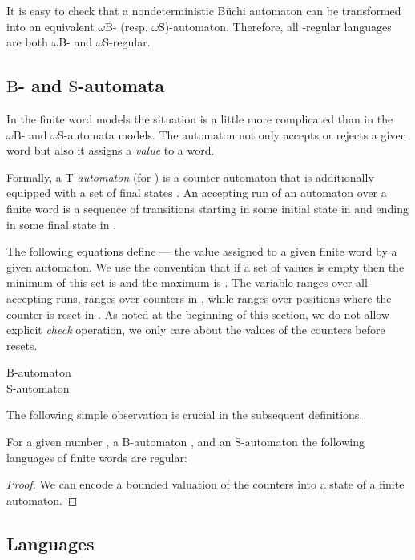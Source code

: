 \documentclass{LMCS}
\newcommand{\wB}{\ensuremath{\omega \mathrm{B}}\xspace}
\newcommand{\wS}{\ensuremath{\omega \mathrm{S}}\xspace}
\newcommand{\fT}{\ensuremath{\mathrm{T}}\xspace}
\newcommand{\fB}{\ensuremath{\mathrm{B}}\xspace}
\newcommand{\fS}{\ensuremath{\mathrm{S}}\xspace}
\begin{document}
It is easy to check that a nondeterministic B\"uchi automaton can be transformed into an equivalent \wB- (resp. \wS)-automaton. Therefore, all -regular languages are both \wB- and \wS-regular.


\subsection{\fB- and \fS-automata} In the finite word models the situation is a little more complicated than in the \wB- and \wS-automata models. The automaton not only accepts or rejects a given word but also it assigns a \emph{value} to a word.

Formally, a \emph{\fT-automaton} (for ) is a counter automaton that is additionally equipped with a set of final states . An accepting run  of an automaton over a finite word  is a sequence of transitions starting in some initial state in  and ending in some final state in .

The following equations define  --- the value assigned to a given finite word by a given automaton. We use the convention that if a set of values is empty then the minimum of this set is  and the maximum is . The variable  ranges over all accepting runs,  ranges over counters in , while  ranges over positions where the counter  is reset in . As noted at the beginning of this section, we do not allow explicit \emph{check} operation, we only care about the values of the counters before resets.

\begin{description}
\item[\fB-automaton ] 
\item[\fS-automaton ] 
\end{description}

The following simple observation is crucial in the subsequent definitions.

\begin{lemma}\label{lm:val_regular}
For a given number , a \fB-automaton , and an \fS-automaton  the following languages of finite words are regular:

\end{lemma}

\begin{proof}
We can encode a bounded valuation of the counters into a state of a finite automaton.
\end{proof}

\subsection{Languages}
\end{document}
